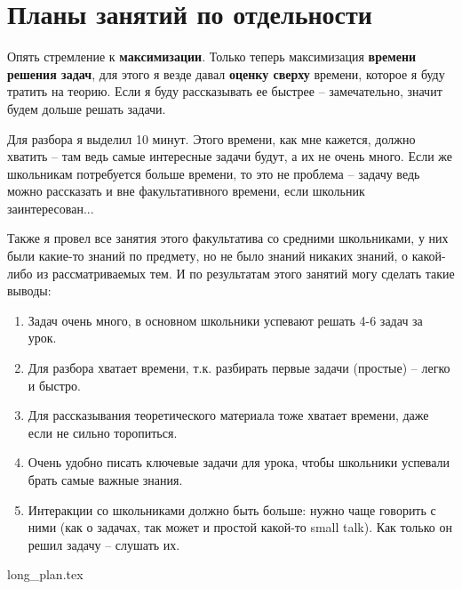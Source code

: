 \documentclass[12pt, oneside]{article}
\begin{document}
\section{Планы занятий по отдельности}
Опять стремление к \textbf{максимизации}. Только теперь максимизация \textbf{времени решения задач}, для этого я везде давал \textbf{оценку сверху} времени, которое я буду тратить на теорию. Если я буду рассказывать ее быстрее -- замечательно, значит будем дольше решать задачи. 

Для разбора я выделил 10 минут. Этого времени, как мне кажется, должно хватить -- там ведь самые интересные задачи будут, а их не очень много. Если же школьникам потребуется больше времени, то это не проблема -- задачу ведь можно рассказать и вне факультативного времени, если школьник заинтересован...

Также я провел все занятия этого факультатива со средними школьниками, у них были какие-то знаний по предмету, но не было знаний никаких знаний, о какой-либо из рассматриваемых тем. И по результатам этого занятий могу сделать такие выводы:

\begin{enumerate}
    \item Задач очень много, в основном школьники успевают решать 4-6 задач за урок.
    \item Для разбора хватает времени, т.к. разбирать первые задачи (простые) -- легко и быстро.
    \item Для рассказывания теоретического материала тоже хватает времени, даже если не сильно торопиться.
    \item Очень удобно писать ключевые задачи для урока, чтобы школьники успевали брать самые важные знания.
    \item Интеракции со школьниками должно быть больше: нужно чаще говорить с ними (как о задачах, так может и простой какой-то small talk). Как только он решил задачу -- слушать их.
\end{enumerate}

{long_plan.tex}
\end{document}
